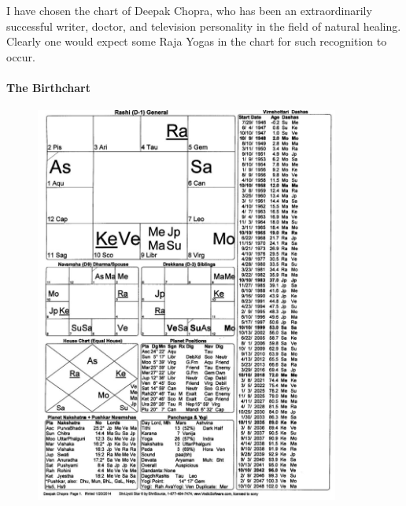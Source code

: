 I have chosen the chart of  Deepak Chopra, who has been an extraordinarily successful writer, doctor, and television personality in the field of natural healing. Clearly one would expect some Raja Yogas in the chart for such recognition to occur.

 

\paragraph{The Birthchart}

 


 \begin{figure}[h]
\centering
\includegraphics[width=10cm]{pics/Deepak-Chopra1.jpg}
\caption{}
\end{figure}
 

